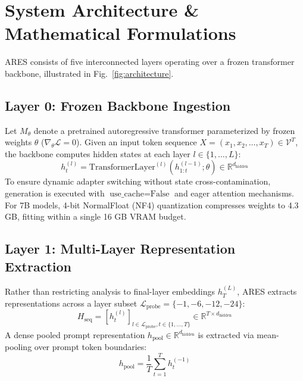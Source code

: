 \documentclass[journal,10pt,twocolumn]{IEEEtran}
\begin{document}
\section{System Architecture \& Mathematical Formulations}

ARES consists of five interconnected layers operating over a frozen transformer backbone, illustrated in Fig.~\ref{fig:architecture}.

\subsection{Layer 0: Frozen Backbone Ingestion}
Let $M_\theta$ denote a pretrained autoregressive transformer parameterized by frozen weights $\theta$ ($\nabla_\theta \mathcal{L} = 0$). Given an input token sequence $X = (x_1, x_2, \dots, x_T) \in \mathcal{V}^T$, the backbone computes hidden states at each layer $l \in \{1, \dots, L\}$:
\begin{equation}
h_t^{(l)} = \text{TransformerLayer}^{(l)}(h_{1:t}^{(l-1)}; \theta) \in \mathbb{R}^{d_{\text{hidden}}}
\end{equation}
To ensure dynamic adapter switching without state cross-contamination, generation is executed with $\text{use\_cache} = \text{False}$ and eager attention mechanisms. For 7B models, 4-bit NormalFloat (NF4) quantization \cite{dettmers2024qlora} compresses weights to 4.3 GB, fitting within a single 16 GB VRAM budget.

\subsection{Layer 1: Multi-Layer Representation Extraction}
Rather than restricting analysis to final-layer embeddings $h_T^{(L)}$, ARES extracts representations across a layer subset $\mathcal{L}_{\text{probe}} = \{-1, -6, -12, -24\}$:
\begin{equation}
H_{\text{seq}} = \left[ h_t^{(l)} \right]_{l \in \mathcal{L}_{\text{probe}}, t \in \{1, \dots, T\}} \in \mathbb{R}^{T \times d_{\text{hidden}}}
\end{equation}
A dense pooled prompt representation $h_{\text{pool}} \in \mathbb{R}^{d_{\text{hidden}}}$ is extracted via mean-pooling over prompt token boundaries:
\begin{equation}
h_{\text{pool}} = \frac{1}{T} \sum_{t=1}^T h_t^{(-1)}
\end{equation}
\end{document}
